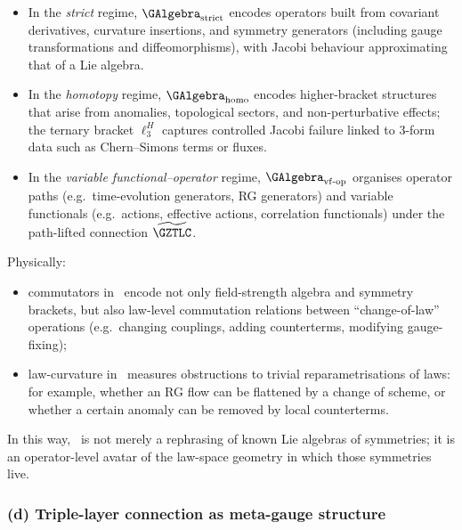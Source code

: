 \documentclass[11pt]{book}
\theoremstyle{plain}
\theoremstyle{definition}
\begin{document}
\begin{itemize}
  \item In the \emph{strict} regime, $\GAlgebra_{\mathrm{strict}}$
        encodes operators built from covariant derivatives, curvature
        insertions, and symmetry generators (including gauge
        transformations and diffeomorphisms), with Jacobi behaviour
        approximating that of a Lie algebra.
  \item In the \emph{homotopy} regime, $\GAlgebra_{\mathrm{homo}}$
        encodes higher-bracket structures that arise from anomalies,
        topological sectors, and non-perturbative effects; the ternary
        bracket $\ell_3^H$ captures controlled Jacobi failure linked
        to 3-form data such as Chern–Simons terms or fluxes.
  \item In the \emph{variable functional--operator} regime,
        $\GAlgebra_{\mathrm{vf\text- op}}$ organises operator paths
        (e.g.\ time-evolution generators, RG generators) and variable
        functionals (e.g.\ actions, effective actions, correlation
        functionals) under the path-lifted connection
        $\widetilde{\GZTLC}$.
\end{itemize}

Physically:

\begin{itemize}
  \item commutators in \GAlgebra\ encode not only field-strength
        algebra and symmetry brackets, but also law-level commutation
        relations between “change-of-law” operations (e.g.\ changing
        couplings, adding counterterms, modifying gauge-fixing);
  \item law-curvature in \GZLCurv\ measures obstructions to trivial
        reparametrisations of laws: for example, whether an RG flow can
        be flattened by a change of scheme, or whether a certain
        anomaly can be removed by local counterterms.
\end{itemize}

In this way, \GAlgebra\ is not merely a rephrasing of known Lie
algebras of symmetries; it is an operator-level avatar of the law-space
geometry in which those symmetries live.



\subsubsection*{(d) Triple-layer connection as meta-gauge structure}
\end{document}
